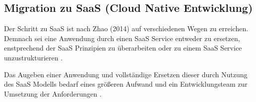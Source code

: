 \subsection{Migration zu SaaS (Cloud Native Entwicklung)}
Der Schritt zu \ac{SaaS} ist nach Zhao (2014) auf verschiedenen Wegen zu erreichen. Demnach sei eine Anwendung durch einen SaaS Service entweder zu ersetzen, enstprechend der SaaS Prinzipien zu überarbeiten oder zu einem \ac{SaaS} Service unzustrukturieren \cite[Vgl.][S. 144]{Zhao2014}.

Das Augeben einer Anwendung und vollständige Ersetzen dieser durch Nutzung des \ac{SaaS} Modells bedarf eines größeren Aufwand und ein Entwicklungsteam zur Umsetzung der Anforderungen \cite[Vgl.][]{CIO}.